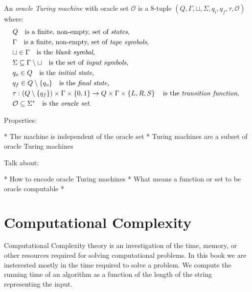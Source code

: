 \begin{definition}
\label{def:Oracle-Turing-Machine}
An \emph{oracle Turing machine} with oracle set $\mathcal{O}$ is a 8-tuple $\left(Q, \Gamma, \sqcup, \Sigma, q_i, q_f, \tau, \mathcal{O} \right)$ where:
\begin{align*}
 & Q \quad \text{is a finite, non-empty, set of \emph{states},} \index{Machine State} \\
 & \Gamma \quad \text{is a finite, non-empty, set of \emph{tape symbols},} \index{Tape Symbol} \\
 & \sqcup\in\Gamma \quad \text{is the \emph{blank symbol},} \index{Blank Symbol} \\
 & \Sigma\subseteq\Gamma\setminus\sqcup \quad \text{is the set of \emph{input symbols},}  \index{Input Symbol} \\
 & q_{o}\in Q \quad \text{is the \emph{initial state},} \index{Initial State} \\
 & q_{f}\in Q \setminus \{q_o\} \quad \text{is the \emph{final state},} \index{Final State} \\ 
 & \tau: \left(Q \setminus \{q_{f}\}\right) \times \Gamma \times \{0, 1\} \rightarrow  Q\times\Gamma\times\left\{ L,R,S\right\} \quad\text{is the \emph{transition function}, \index{Transition Function} } \\
 & \mathcal{O} \subseteq \Sigma^\ast \quad \text{is the \emph{oracle set}.}
\end{align*}
\end{definition}

Properties:

 * The machine is independent of the oracle set
 * Turing machines are a subset of oracle Turing machines

Talk about:

 * How to encode oracle Turing machines
 * What means a function or set to be oracle computable
 * 

%
%

\section{Computational Complexity}
\label{sec:computational_complexity}

{\color{red} Computational Complexity theory is an investigation of the time, memory, or other resources required for solving computational problems.} In this book we are insterested mostly in the time required to solve a problem. {\color{red} We compute the running time of an algorithm as a function of the length of the string representing the input.}

